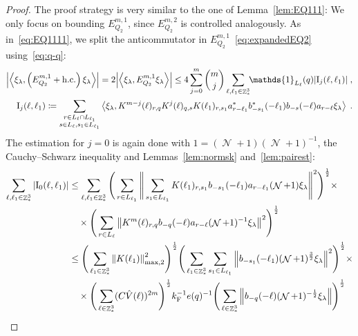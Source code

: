 \documentclass[12pt,a4paper]{article}
\numberwithin{equation}{section}
\newcommand{\1}{\mathbb{I}}
\newcommand{\F}{\mathrm{F}}
\newcommand{\I}{\mathrm{I}}
\DeclareMathOperator{\Z}{\mathbb{Z}}
\DeclareMathOperator{\NN}{\mathcal{N}}
\newcommand{\half}{\frac{1}{2}}
\newcommand{\eva}[1]{\left\langle #1 \right\rangle}
\theoremstyle{plain}
\theoremstyle{definition}
\theoremstyle{remark}
\theoremstyle{plain}
\theoremstyle{definition}
\theoremstyle{remark}
\begin{document}
\begin{proof}
The proof strategy is very similar to the one of Lemma~\ref{lem:EQ111}: We only focus on bounding $ E^{m,1}_{Q_2} $, since $ E^{m,2}_{Q_2} $ is controlled analogously.
As in~\eqref{eq:EQ1111}, we split the anticommutator in $ E^{m,1}_{Q_2} $~\eqref{eq:expandedEQ2} using~\eqref{eq:q-q}:
\begin{equation} \label{eq:EQ2111}
\begin{aligned}
	\abs{\eva{\xi_\lambda,\left(E^{m,1}_{Q_2}+\mathrm{h.c.}\right) \xi_\lambda }} 
	= 2\abs{\eva{\xi_\lambda, E^{m,1}_{Q_2} \xi_\lambda }}
	\le 4 \sum_{j=0}^m {{m}\choose j} \sum\limits_{\ell,\ell_1 \in \Z^3_*}\!\! \mathds{1}_{L_\ell}(q) |\I_j(\ell, \ell_1)| \;,\\
	\I_j(\ell, \ell_1)
	\coloneq \sum\limits_{\substack{r\in L_{\ell} \cap L_{\ell_1}\\ s \in L_{\ell},s_1\in L_{\ell_1}}}
		\eva{\xi_\lambda, K^{m-j}(\ell)_{r,q} K^{j}(\ell)_{q,s} K(\ell_1)_{r,s_1} a^*_{r-\ell_1} b^*_{-s_1}(-\ell_1) b_{-s}(-\ell) a_{r-\ell} \xi_\lambda} \;. \\
\end{aligned}
\end{equation}
The estimation for $ j = 0 $ is again done with \textcolor{green!30!black}{$1 = (\NN+1)(\NN+1)^{-1}$}, the Cauchy--Schwarz inequality and Lemmas~\ref{lem:normsk} and~\ref{lem:pairest}:
\textcolor{green!30!black}{
\begin{align}
	\sum_{\ell,\ell_1 \in \Z^3_*} |\I_0(\ell, \ell_1)|
 	&\leq \sum\limits_{\ell,\ell_1 \in \Z^3_*} \Bigg( \sum\limits_{r \in L_{\ell_1}} 
 		\Bigg\Vert \sum\limits_{s_1 \in L_{\ell_1}} K(\ell_1)_{r,s_1} b_{-s_1}(-\ell_1) a_{r-\ell_1} (\NN+1) \xi_\lambda \Bigg\Vert^2\Bigg)^\half \times\nonumber\\
 	&\quad \times \Bigg( \sum\limits_{r \in L_\ell} \norm{K^{m}(\ell)_{r,q} b_{-q}(-\ell) a_{r-\ell} (\NN+1)^{-1}\xi_\lambda }^2\Bigg)^\half \nonumber\\
 	&\leq \Bigg( \sum\limits_{\ell_1 \in \Z^3_*} \norm{K(\ell_1)}_{\mathrm{max,2}}^2 \Bigg)^{\half} \Bigg(
 		\sum\limits_{\ell_1 \in \Z^3_*} \sum\limits_{s_1 \in L_{\ell_1}} \norm{ b_{-s_1}(-\ell_1) (\NN+1)^{\frac 32}\xi_\lambda}^2\Bigg)^\half \times\nonumber\\
 	&\quad \times \Bigg( \sum\limits_{\ell \in \Z^3_*}(C \hat{V}(\ell))^{2m} \Bigg)^{\half} k_{\F}^{-1} e(q)^{-1} \Bigg( \sum\limits_{\ell \in \Z^3_*} \norm{b_{-q}(-\ell) (\NN+1)^{-\half} \xi_\lambda } \Bigg)^{\half} \nonumber\\

\end{align}}
\end{proof}
\end{document}
